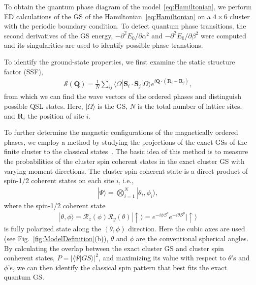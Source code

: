 \documentclass[aps,prb,reprint,amsfonts,amsmath,amssymb,showpacs,groupedaddress,superscriptaddress]{revtex4-1}
\begin{document}
To obtain the quantum phase diagram of the model~\eqref{eq:Hamiltonian}, we perform ED calculations of the GS of the Hamiltonian~\eqref{eq:Hamiltonian} on a $4 \times 6$ cluster with the periodic boundary condition. To detect quantum phase transitions, the second derivatives of the GS energy, $-\partial^2E_0/\partial\alpha^2$ and $-\partial^2E_0/\partial\beta^2$ were computed and its singularities are used to identify possible phase transtions.

To identify the ground-state properties, we first examine the static structure factor (SSF),
\begin{align}
    \mathcal{S}(\bm{Q}) = \frac{1}{N} \sum_{ij} \langle \Omega | \bm{S}_i \cdot \bm{S}_j | \Omega \rangle e^{i \bm{Q} \cdot (\bm{R}_i - \bm{R}_j)},
    \label{eq:SSF}
\end{align}
from which we can find the wave vectors of the ordered phases and distinguish possible QSL states. Here, $|\Omega\rangle$ is the GS, $N$ is the total number of lattice sites, and $\bm{R}_i$ the position of site $i$.

To further determine the magnetic configurations of the magnetically ordered phases, we employ a method by studying the projections of the exact GSs of the finite cluster to the classical states~\cite{PhysRevB.94.064435}. The basic idea of this method is to measure the probabilities of the cluster spin coherent states in the exact cluster GS with varying moment directions. The cluster spin coherent state is a direct product of spin-1/2 coherent states on each site $i$, i.e.,
\begin{align}
    | \Psi \rangle = \bigotimes_{i=1}^{N} | \theta_{i}, \phi_{i} \rangle,
    \label{eq:ClusterCoherentState}
\end{align}
where the spin-1/2 coherent state
\begin{align}
    | \theta, \phi \rangle = \mathcal{R}_{z}(\phi) \mathcal{R}_{y}(\theta) | \uparrow \rangle = e^{-i \phi S^z} e^{-i \theta S^y} | \uparrow \rangle
    \label{eq:Spin-1/2CoherentState}
\end{align}
is fully polarized state along the $(\theta, \phi)$ direction. Here the cubic axes are used (see Fig.~\ref{fig:ModelDefinition}(b)), $\theta$ and $\phi$ are the conventional spherical angles. By calculating the overlap between the exact cluster GS and cluster spin conherent states, $P = | \langle \Psi | GS \rangle |^2$, and maximizing its value with respect to $\theta$'s and $\phi$'s, we can then identify the classical spin pattern that best fits the exact quantum GS.
\end{document}
